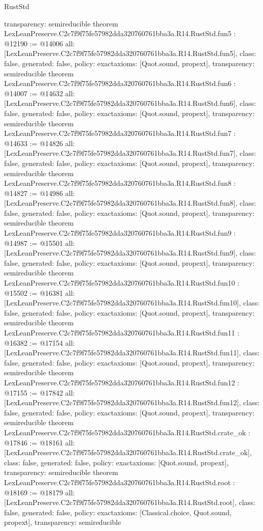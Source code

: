 \begin{lexlean}{RustStd}
\begin{coremodule}
{  transparency: semireducible
}
theorem LexLeanPreserve.C2c7f9f75fe57982dda320760761bba3a.R14.RustStd.fun5 : @12190 := @14006 {
  all: [LexLeanPreserve.C2c7f9f75fe57982dda320760761bba3a.R14.RustStd.fun5],
  class: false,
  generated: false,
  policy: exact{axioms: [Quot.sound, propext]},
  transparency: semireducible
}
theorem LexLeanPreserve.C2c7f9f75fe57982dda320760761bba3a.R14.RustStd.fun6 : @14007 := @14632 {
  all: [LexLeanPreserve.C2c7f9f75fe57982dda320760761bba3a.R14.RustStd.fun6],
  class: false,
  generated: false,
  policy: exact{axioms: [Quot.sound, propext]},
  transparency: semireducible
}
theorem LexLeanPreserve.C2c7f9f75fe57982dda320760761bba3a.R14.RustStd.fun7 : @14633 := @14826 {
  all: [LexLeanPreserve.C2c7f9f75fe57982dda320760761bba3a.R14.RustStd.fun7],
  class: false,
  generated: false,
  policy: exact{axioms: [Quot.sound, propext]},
  transparency: semireducible
}
theorem LexLeanPreserve.C2c7f9f75fe57982dda320760761bba3a.R14.RustStd.fun8 : @14827 := @14986 {
  all: [LexLeanPreserve.C2c7f9f75fe57982dda320760761bba3a.R14.RustStd.fun8],
  class: false,
  generated: false,
  policy: exact{axioms: [Quot.sound, propext]},
  transparency: semireducible
}
theorem LexLeanPreserve.C2c7f9f75fe57982dda320760761bba3a.R14.RustStd.fun9 : @14987 := @15501 {
  all: [LexLeanPreserve.C2c7f9f75fe57982dda320760761bba3a.R14.RustStd.fun9],
  class: false,
  generated: false,
  policy: exact{axioms: [Quot.sound, propext]},
  transparency: semireducible
}
theorem LexLeanPreserve.C2c7f9f75fe57982dda320760761bba3a.R14.RustStd.fun10 : @15502 := @16381 {
  all: [LexLeanPreserve.C2c7f9f75fe57982dda320760761bba3a.R14.RustStd.fun10],
  class: false,
  generated: false,
  policy: exact{axioms: [Quot.sound, propext]},
  transparency: semireducible
}
theorem LexLeanPreserve.C2c7f9f75fe57982dda320760761bba3a.R14.RustStd.fun11 : @16382 := @17154 {
  all: [LexLeanPreserve.C2c7f9f75fe57982dda320760761bba3a.R14.RustStd.fun11],
  class: false,
  generated: false,
  policy: exact{axioms: [Quot.sound, propext]},
  transparency: semireducible
}
theorem LexLeanPreserve.C2c7f9f75fe57982dda320760761bba3a.R14.RustStd.fun12 : @17155 := @17842 {
  all: [LexLeanPreserve.C2c7f9f75fe57982dda320760761bba3a.R14.RustStd.fun12],
  class: false,
  generated: false,
  policy: exact{axioms: [Quot.sound, propext]},
  transparency: semireducible
}
theorem LexLeanPreserve.C2c7f9f75fe57982dda320760761bba3a.R14.RustStd.crate_ok : @17846 := @18161 {
  all: [LexLeanPreserve.C2c7f9f75fe57982dda320760761bba3a.R14.RustStd.crate_ok],
  class: false,
  generated: false,
  policy: exact{axioms: [Quot.sound, propext]},
  transparency: semireducible
}
theorem LexLeanPreserve.C2c7f9f75fe57982dda320760761bba3a.R14.RustStd.root : @18169 := @18179 {
  all: [LexLeanPreserve.C2c7f9f75fe57982dda320760761bba3a.R14.RustStd.root],
  class: false,
  generated: false,
  policy: exact{axioms: [Classical.choice, Quot.sound, propext]},
  transparency: semireducible
}


\end{coremodule}
\end{lexlean}
